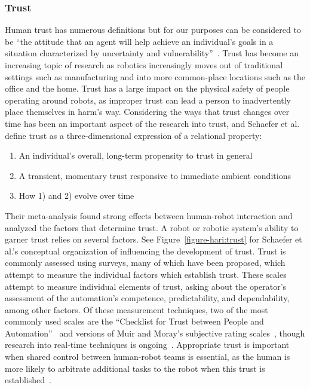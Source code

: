 \subsubsection{Trust}
Human trust has numerous definitions but for our purposes can be considered to be ``the attitude that an agent will help achieve an individual's goals in a situation characterized by uncertainty and vulnerability''~\citep{lee_trust_2004}.
Trust has become an increasing topic of research as robotics increasingly moves out of traditional settings such as manufacturing and into more common-place locations such as the office and the home.
Trust has a large impact on the physical safety of people operating around robots, as improper trust can lead a person to inadvertently place themselves in harm's way.
Considering the ways that trust changes over time has been an important aspect of the research into trust, and Schaefer et al. define trust as a three-dimensional expression of a relational property:
\begin{enumerate}
    \item An individual's overall, long-term propensity to trust in general
    \item A transient, momentary trust responsive to immediate ambient conditions
    \item How 1) and 2) evolve over time~\citep{schaefer_meta-analysis_2016}
\end{enumerate}
Their meta-analysis found strong effects between human-robot interaction and analyzed the factors that determine trust.
A robot or robotic system's ability to garner trust relies on several factors.
See Figure~\ref{figure-hari:trust} for Schaefer et al.'s conceptual organization of influencing the development of trust.
Trust is commonly assessed using surveys, many of which have been proposed, which attempt to measure the individual factors which establish trust.
These scales attempt to measure individual elements of trust, asking about the operator's assessment of the automation's competence, predictability, and dependability, among other factors.
Of these measurement techniques, two of the most commonly used scales are the ``Checklist for Trust between People and Automation''~\citep{jian_foundations_2000} and versions of Muir and Moray's subjective rating scales~\citep{muir_trust_1996}, though research into real-time techniques is ongoing~\citep{SEPPELT201966}.
Appropriate trust is important when shared control between human-robot teams is essential, as the human is more likely to arbitrate additional tasks to the robot when this trust is established~\citep{losey_review_2018}.

